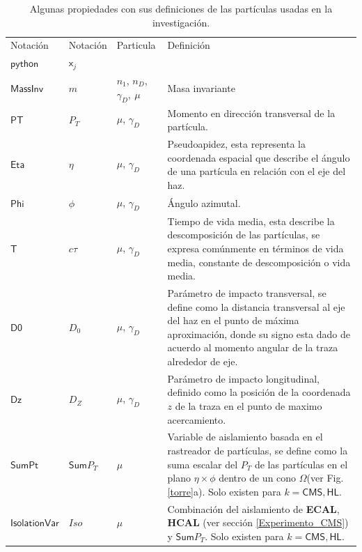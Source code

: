 \begin{table}[!t]
\small
\centering
\begin{tabular}{|p{}p{}p{}p{}|}
\toprule
Notación & Notación & Particula & Definición\\
$\textsf{python}$ & $\textsf{x}_j$ &  & \\ 
\midrule
$\textsf{MassInv}$ & $m$ & $n_1$,    $n_D$, $\gamma_D,~ \mu$ & Masa invariante\\
$\textsf{PT}$ & $P_{T}$ & $\mu$, $\gamma_D$ & Momento en dirección transversal de la partícula.\\
$\textsf{Eta}$ & $\eta$ & $\mu$, $\gamma_D$ & Pseudoapidez, esta representa la coordenada espacial que describe el ángulo de una partícula en relación con el eje del haz. \\
$\textsf{Phi}$ & $\phi$ &  $\mu$, $\gamma_D$ & Ángulo azimutal.\\
$\textsf{T}$ & $c\tau$ &  $\mu$, $\gamma_D$  & Tiempo de vida media, esta describe la descomposición de las partículas, se expresa comúnmente en términos de vida media, constante de descomposición o vida media. \\
$\textsf{D0}$ & $D_0$ &  $\mu$, $\gamma_D$  & Parámetro de impacto transversal, se define como la distancia transversal al eje del haz en el punto de máxima aproximación, donde su signo esta dado de acuerdo al momento angular de la traza alrededor de eje.\\
$\textsf{Dz}$ & $D_Z$ & $\mu$, $\gamma_D$   & Parámetro de impacto longitudinal, definido como la posición de la coordenada $z$ de la traza en el punto de maximo acercamiento.\\
$\textsf{SumPt}$ & $\textsf{Sum}P_T$ & $\mu$  & Variable de aislamiento basada en el rastreador de partículas, se define como la suma escalar del $P_T$ de las partículas en el plano $\eta \times \phi$ dentro de un cono $\Omega$(ver Fig. \ref{torre}a). Solo existen para $k=\textsf{CMS},  \textsf{HL}$. \\
$\textsf{IsolationVar}$ & $Iso$ & $\mu$ & Combinación del aislamiento de \textbf{ECAL}, \textbf{HCAL} (ver sección \ref{Experimento_CMS}) y $\textsf{Sum}P_T$. Solo existen para $k=\textsf{CMS},  \textsf{HL}$.\\

\bottomrule
\end{tabular}
\caption{Algunas propiedades con sus definiciones de las partículas usadas en la investigación.}
\label{propiedades}
\end{table}

